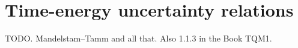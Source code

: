 \section{Time-energy uncertainty relations}

TODO. Mandelstam--Tamm and all that. Also 1.1.3 in the Book TQM1.